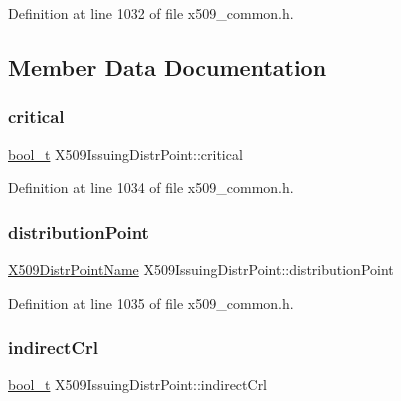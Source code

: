 Definition at line 1032 of file x509\+\_\+common.\+h.



\subsection{Member Data Documentation}
\mbox{\label{structX509IssuingDistrPoint_a8a4ba72628597652b8722195d3b0e4c5}} 
\subsubsection{\texorpdfstring{critical}{critical}}
{\footnotesize\ttfamily \hyperlink{compiler__port_8h_a812d16e5494522586b3784e55d479912}{bool\+\_\+t} X509\+Issuing\+Distr\+Point\+::critical}



Definition at line 1034 of file x509\+\_\+common.\+h.

\mbox{\label{structX509IssuingDistrPoint_a606d3c2cd4e2e1edb16231e71e7f8233}} 
\subsubsection{\texorpdfstring{distribution\+Point}{distributionPoint}}
{\footnotesize\ttfamily \hyperlink{structX509DistrPointName}{X509\+Distr\+Point\+Name} X509\+Issuing\+Distr\+Point\+::distribution\+Point}



Definition at line 1035 of file x509\+\_\+common.\+h.

\mbox{\label{structX509IssuingDistrPoint_a9caa38c5038747f071f9b03970a1e9e6}} 
\subsubsection{\texorpdfstring{indirect\+Crl}{indirectCrl}}
{\footnotesize\ttfamily \hyperlink{compiler__port_8h_a812d16e5494522586b3784e55d479912}{bool\+\_\+t} X509\+Issuing\+Distr\+Point\+::indirect\+Crl}



